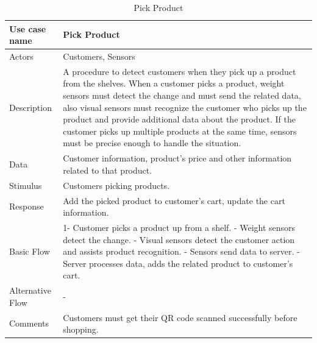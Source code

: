 \documentclass[11pt]{article}
\begin{document}
        
                
        \begin{table}[H]
        \begin{centering} 
        
        \begin{tabular}{|p{2.5cm}|p{12cm}|}
        \hline
        Use case name & Pick Product  \\ \hline
        Actors        & Customers, Sensors  \\ \hline
        Description   & A procedure to detect customers when they pick up a product from the shelves. When a customer picks a product, weight sensors must detect the change and must send the related data, also visual sensors must recognize the customer who picks up the product and provide additional data about the product. If the customer picks up multiple products at the same time, sensors must be precise enough to handle the situation.  \\ \hline
        Data          & Customer information, product's price and other information
                        related to that product. \\ \hline
        Stimulus      & Customers picking products. \\ \hline
        Response      & Add the picked product to customer's cart, update the cart information. \\ \hline
        Basic Flow    & 
        1- Customer picks a product up from a shelf. \newline
        2- Weight sensors detect the change. \newline
        3- Visual sensors detect the customer action and assists product recognition. \newline
        4- Sensors send data to server. \newline
        5- Server processes data, adds the related product to customer's cart.
        \\ \hline
        Alternative
            Flow      & - \\ \hline
        Comments      & Customers must get their QR code scanned successfully before shopping. \\ \hline
        
        \end{tabular}
        \caption{Pick Product}
        \label{tab1}
        \end{centering}
        \end{table}    
        
\end{document}

